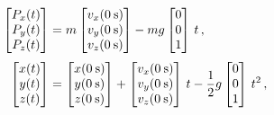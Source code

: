 \documentclass[a4paper,12pt,%
onecolumn,oneside,%
british%
]{memoir}
\renewcommand*{\bm}[1]{\textpdfrender{TextRenderingMode=2,LineWidth=0.2pt}{\boldsymbol{#1}}}
\renewcommand*{\|}[1][]{\nonscript\:#1\vert\nonscript\:\mathopen{}}
\newcommand*{\yv}{\bm{v}}
\newcommand*{\ym}{m}%
\newcommand*{\yP}{\bm{P}}
\begin{document}
\begin{equation*}
  \begin{aligned}
    \begin{bmatrix}
      P_{x}(t) \\ P_{y}(t) \\ P_{z}(t)
    \end{bmatrix}
    &=
    \ym
    \begin{bmatrix}
      v_{x}(\qty{0}{s}) \\ v_{y}(\qty{0}{s}) \\ v_{z}(\qty{0}{s})
    \end{bmatrix}
    - \ym g \begin{bmatrix}
      0\\0\\1
    \end{bmatrix}\, t \,,
    \\[\jot]
    \begin{bmatrix}
      x(t)\\y(t)\\z(t)
    \end{bmatrix}
    &=
    \begin{bmatrix}
      x(\qty{0}{s})\\y(\qty{0}{s})\\z(\qty{0}{s})
    \end{bmatrix}
    +
    \begin{bmatrix}
      v_{x}(\qty{0}{s}) \\ v_{y}(\qty{0}{s}) \\ v_{z}(\qty{0}{s})
    \end{bmatrix}\, t
    - \frac12 g \begin{bmatrix}
      0\\0\\1
    \end{bmatrix}\,t^{2}
    \,,
  \end{aligned}
\end{equation*}
%
\end{document}
